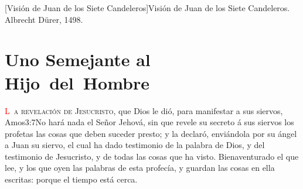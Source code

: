 [Visión de Juan de los Siete Candeleros]{Visión de Juan de los Siete Candeleros. Albrecht Dürer, 1498.}

\pagestyle{fancy}
\mainmatter
\trimFrame
\chapter{Uno Semejante \linebreak[0]al \mbox{Hijo del Hombre}}
\begingroup
\let\clearpage\relax
\endgroup
\lettrine[lines=3,loversize=0.05]{\textcolor{red}{L}}{\ a revelación de Jesucristo}, que Dios le dió, para manifestar a sus siervos,%
			{Amos}{3:7}{No hará nada el Señor Jehová, sin que revele su secreto á sus siervos los profetas}
 las cosas que deben suceder presto; y la declaró, enviándola por su ángel a Juan su siervo, %
el cual ha dado testimonio de la palabra de Dios, y del testimonio de Jesucristo, y de todas las cosas que ha visto. %
Bienaventurado el que lee, y los que oyen las palabras de esta profecía, y guardan las cosas en ella escritas: porque el tiempo está cerca.
